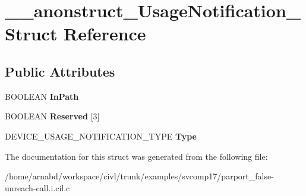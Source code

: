 \hypertarget{struct____anonstruct__UsageNotification__78}{}\section{\+\_\+\+\_\+anonstruct\+\_\+\+Usage\+Notification\+\_ Struct Reference}
\label{struct____anonstruct__UsageNotification__78}
\subsection*{Public Attributes}
\begin{DoxyCompactItemize}
\item 
\hypertarget{struct____anonstruct__UsageNotification__78_af5ef44de1a55fb35ef9da593432d0be5}{}B\+O\+O\+L\+E\+A\+N {\bfseries In\+Path}\label{struct____anonstruct__UsageNotification__78_af5ef44de1a55fb35ef9da593432d0be5}

\item 
\hypertarget{struct____anonstruct__UsageNotification__78_ad2d7502db72ac88b5a78f2aa37ee72a0}{}B\+O\+O\+L\+E\+A\+N {\bfseries Reserved} \mbox{[}3\mbox{]}\label{struct____anonstruct__UsageNotification__78_ad2d7502db72ac88b5a78f2aa37ee72a0}

\item 
\hypertarget{struct____anonstruct__UsageNotification__78_a2e65c3a0eae31d9e22589ba67b50008a}{}D\+E\+V\+I\+C\+E\+\_\+\+U\+S\+A\+G\+E\+\_\+\+N\+O\+T\+I\+F\+I\+C\+A\+T\+I\+O\+N\+\_\+\+T\+Y\+P\+E {\bfseries Type}\label{struct____anonstruct__UsageNotification__78_a2e65c3a0eae31d9e22589ba67b50008a}

\end{DoxyCompactItemize}


The documentation for this struct was generated from the following file\+:\begin{DoxyCompactItemize}
\item 
/home/arnabd/workspace/civl/trunk/examples/svcomp17/parport\+\_\+false-\/unreach-\/call.\+i.\+cil.\+c\end{DoxyCompactItemize}
